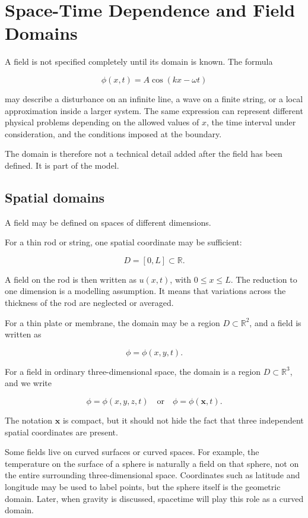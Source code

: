 \section{Space-Time Dependence and Field Domains}
\label{sec:field_domains_and_spacetime_dependence}

A field is not specified completely until its domain is known. The formula

\[
\phi(x,t)=A\cos(kx-\omega t)
\]

may describe a disturbance on an infinite line, a wave on a finite string, or a local approximation inside a larger system. The same expression can represent different physical problems depending on the allowed values of \(x\), the time interval under consideration, and the conditions imposed at the boundary.

The domain is therefore not a technical detail added after the field has been defined. It is part of the model.

\subsection{Spatial domains}

A field may be defined on spaces of different dimensions.

For a thin rod or string, one spatial coordinate may be sufficient:

\[
D=[0,L]\subset\mathbb{R}.
\]

A field on the rod is then written as \(u(x,t)\), with \(0\leq x\leq L\). The reduction to one dimension is a modelling assumption. It means that variations across the thickness of the rod are neglected or averaged.

For a thin plate or membrane, the domain may be a region \(D\subset\mathbb{R}^{2}\), and a field is written as

\[
\phi=\phi(x,y,t).
\]

For a field in ordinary three-dimensional space, the domain is a region \(D\subset\mathbb{R}^{3}\), and we write

\[
\phi=\phi(x,y,z,t)
\quad\text{or}\quad
\phi=\phi(\mathbf{x},t).
\]

The notation \(\mathbf{x}\) is compact, but it should not hide the fact that three independent spatial coordinates are present.

Some fields live on curved surfaces or curved spaces. For example, the temperature on the surface of a sphere is naturally a field on that sphere, not on the entire surrounding three-dimensional space. Coordinates such as latitude and longitude may be used to label points, but the sphere itself is the geometric domain. Later, when gravity is discussed, spacetime will play this role as a curved domain.

